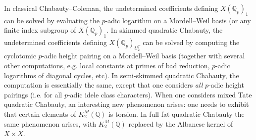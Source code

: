 \documentclass[11pt]{amsart}
\def\Q{\mathbb Q}
\theoremstyle{plain}
\theoremstyle{definition}
\begin{document}
In classical Chabauty--Coleman, the undetermined coefficients defining $X(\Q _p )_1 $ can be solved by evaluating the $p$-adic logarithm on a Mordell--Weil basis (or any finite index subgroup of $X(\Q _p )_1$. In skimmed quadratic Chabauty, the undetermined coefficients defining $X(\Q _p )_{U_2 ^T}$ can be solved by computing the cyclotomic $p$-adic height pairing on a Mordell--Weil basis (together with several other computations, e.g. local constants at primes of bad reduction, $p$-adic logarithms of diagonal cycles, etc). In semi-skimmed quadratic Chabauty, the computation is essentially the same, except that one considers \textit{all} $p$-adic height pairings (i.e. for all $p$-adic idele class characters). When one considers mixed Tate quadratic Chabauty, an interesting new phenomenon arises: one needs to exhibit that certain elements of $K_2 ^M (\Q )$ is torsion. In full-fat quadratic Chabauty the same phenomenon arises, with $K_2 ^M (\Q )$ replaced by the Albanese kernel of $X\times X$.
\end{document}
